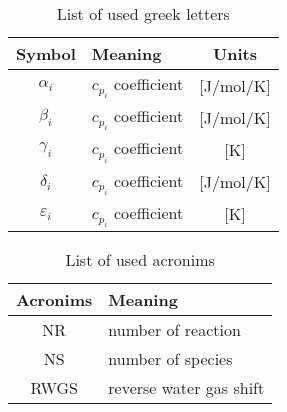 \begin{table}[!h]
    \centering
    \caption{List of used greek letters}
    \vspace{2mm}
    \begin{tabular}{c|l|c}
    \textbf{Symbol} & \textbf{Meaning} & \textbf{Units}\\ \hline
        $\alpha_i$      & $c_{p_i}$ coefficient & [J/mol/K]\\
        $\beta_i$       & $c_{p_i}$ coefficient & [J/mol/K]\\
        $\gamma_i$      & $c_{p_i}$ coefficient & [K]\\
        $\delta_i$      & $c_{p_i}$ coefficient & [J/mol/K]\\
        $\varepsilon_i$ & $c_{p_i}$ coefficient & [K]\\
    \end{tabular}
    \label{tab: greek-letter}
\end{table}

\begin{table}[!h]
    \centering
    \caption{List of used acronims}
    \vspace{2mm}
    \begin{tabular}{c|l}
    \textbf{Acronims}& \textbf{Meaning} \\ \hline
        NR & number of reaction \\
        NS & number of species \\
        RWGS & reverse water gas shift \\
    \end{tabular}
    \label{tab: acronyms}
\end{table}